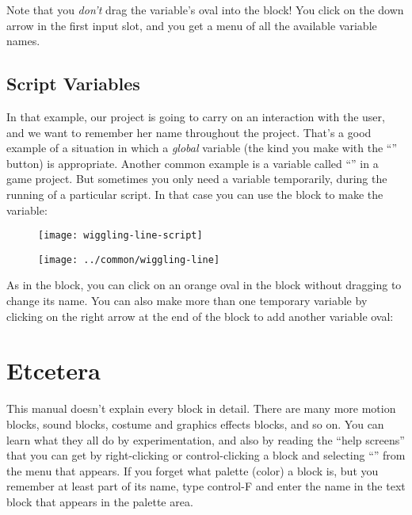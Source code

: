 \documentclass{report}
\begin{document}

Note that you \emph{don't} drag the variable's oval into the  block! You click on the down arrow in the first input slot, and you get a menu of all the available variable names.

\subsection{Script Variables}

In that example, our project is going to carry on an interaction with the user, and we want to remember her name throughout the project. That's a good example of a situation in which a \emph{global} variable (the kind you make with the ``'' button) is appropriate. Another common example is a variable called ``'' in a game project. But sometimes you only need a variable temporarily, during the running of a particular script. In that case you can use the  block to make the variable:\nopagebreak

\begin{figure}[H]
\begin{minipage}{0.5\textwidth}
\centering
\texttt{[image: wiggling-line-script]}%
\end{minipage}%
\begin{minipage}{0.5\textwidth}
\centering
\texttt{[image: ../common/wiggling-line]}
\end{minipage}%
\end{figure}

As in the  block, you can click on an orange oval in the  block without dragging to change its name. You can also make more than one temporary variable by clicking on the right arrow at the end of the block to add another variable oval:\nopagebreak


\section{Etcetera}

This manual doesn't explain every block in detail. There are many more motion blocks, sound blocks, costume and graphics effects blocks, and so on. You can learn what they all do by experimentation, and also by reading the ``help screens'' that you can get by right-clicking or control-clicking a block and selecting ``'' from the menu that appears. If you forget what palette (color) a block is, but you remember at least part of its name, type control-F and enter the name in the text block that appears in the palette area.
\end{document}
